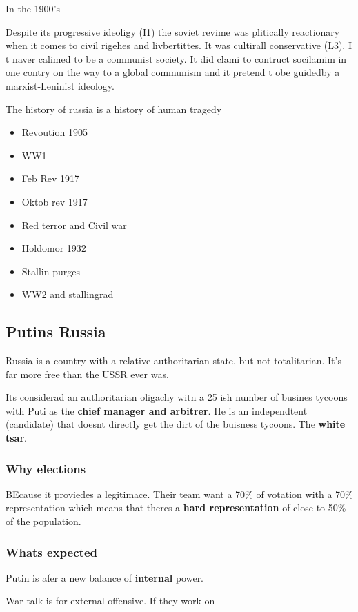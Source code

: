 In the 1900's

Despite its progressive ideoligy (I1) the soviet revime was plitically reactionary when it comes to civil rigehes and livbertittes. It was cultirall conservative (L3).
I t naver calimed to be a communist society. It did clami to contruct socilamim in one contry on the way to a global communism and it pretend t obe guidedby a marxist-Leninist ideology. 

The history of russia is a history of human tragedy
\begin{itemize}
	\item Revoution 1905
	\item WW1
	\item Feb Rev 1917
	\item Oktob rev 1917
	\item Red terror and Civil war
	\item Holdomor 1932
	\item Stallin purges
	\item WW2 and stallingrad
\end{itemize}


\subsection{Putins Russia} 
Russia is a country with a relative authoritarian state, but not totalitarian. It's far more free than the USSR ever was.

Its considerad an authoritarian oligachy witn a 25 ish number of busines tycoons with Puti as the \textbf{chief manager and arbitrer}. He is an independtent (candidate) that doesnt directly get the dirt of the buisness tycoons. The \textbf{white tsar}.


\subsubsection{Why elections} 
BEcause it proviedes a legitimace. Their team want a 70\% of votation with a 70\% representation which means that theres a \textbf{hard representation} of close to 50\% of the population.

\subsubsection{Whats expected}
Putin is afer a new balance of \textbf{internal} power.

War talk is for external offensive. If they work on 

